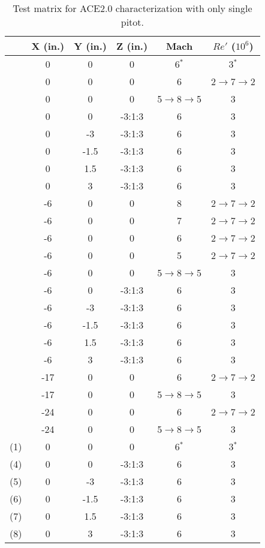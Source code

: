 \setcounter{rownum}{0}
\begin{table}[ht!]
    \centering
    \begin{tabular}{|>{\stepcounter{rownum}\therownum}c|c|c|c|c|c|}
        \hline
        \multicolumn{1}{|c|}{\textbf{Run}} & \textbf{X (in.)} & \textbf{Y (in.)} & \textbf{Z (in.)} & \textbf{Mach} & \textbf{$Re'$ ($10^6$)} \\ \hline
        & 0 & 0 & 0 & 6$^*$ & 3$^*$ \\ \hline
        & 0 & 0 & 0 & 6 & 2$\to$7$\to$2 \\ \hline
        & 0 & 0 & 0 & 5$\to$8$\to$5 & 3 \\ \hline
        & 0 & 0 & -3:1:3 & 6 & 3 \\ \hline
        & 0 & -3 & -3:1:3 & 6 & 3 \\ \hline
        & 0 & -1.5 & -3:1:3 & 6 & 3 \\ \hline
        & 0 & 1.5 & -3:1:3 & 6 & 3 \\ \hline
        & 0 & 3 & -3:1:3 & 6 & 3 \\ \hline
        & -6 & 0 & 0 & 8 & 2$\to$7$\to$2 \\ \hline
        & -6 & 0 & 0 & 7 & 2$\to$7$\to$2 \\ \hline
        & -6 & 0 & 0 & 6 & 2$\to$7$\to$2 \\ \hline
        & -6 & 0 & 0 & 5 & 2$\to$7$\to$2 \\ \hline
        & -6 & 0 & 0 & 5$\to$8$\to$5 & 3 \\ \hline
        & -6 & 0 & -3:1:3 & 6 & 3 \\ \hline
        & -6 & -3 & -3:1:3 & 6 & 3 \\ \hline
        & -6 & -1.5 & -3:1:3 & 6 & 3 \\ \hline
        & -6 & 1.5 & -3:1:3 & 6 & 3 \\ \hline
        & -6 & 3 & -3:1:3 & 6 & 3 \\ \hline
        & -17 & 0 & 0 & 6 & 2$\to$7$\to$2 \\ \hline
        & -17 & 0 & 0 & 5$\to$8$\to$5 & 3 \\ \hline
        & -24 & 0 & 0 & 6 & 2$\to$7$\to$2 \\ \hline
        & -24 & 0 & 0 & 5$\to$8$\to$5 & 3 \\ \hline
        (1) & 0 & 0 & 0 & 6$^*$ & 3$^*$ \\ \hline
        (4) & 0 & 0 & -3:1:3 & 6 & 3 \\ \hline
        (5) & 0 & -3 & -3:1:3 & 6 & 3 \\ \hline
        (6) & 0 & -1.5 & -3:1:3 & 6 & 3 \\ \hline
        (7) & 0 & 1.5 & -3:1:3 & 6 & 3 \\ \hline
        (8) & 0 & 3 & -3:1:3 & 6 & 3 \\ \hline
    \end{tabular}
    \caption{Test matrix for ACE2.0 characterization with only single pitot.}
    \label{tab:ace2-survey-norake}
\end{table}


